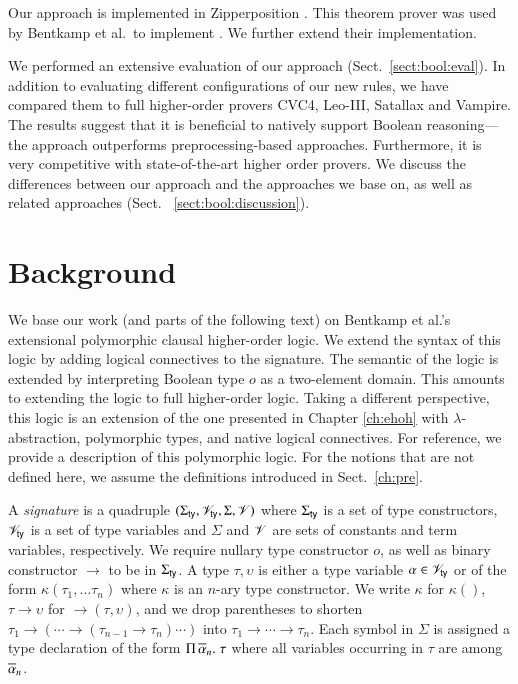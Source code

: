 Our approach is implemented in Zipperposition
\cite{sc-15-simon-phd,sc-supind-17}. This theorem prover was used by Bentkamp et al.\
to implement \lsup{}. We further extend
their implementation.

We performed an extensive evaluation of our approach (Sect.~\ref{sect:bool:eval}).
In addition to evaluating different configurations of our new rules, we have
compared them to full higher-order provers CVC4, Leo-III,  Satallax and Vampire.
The results suggest that it is beneficial to natively support Boolean reasoning---the approach outperforms preprocessing-based approaches. Furthermore, it is
very competitive with state-of-the-art higher order provers. We discuss the differences between our approach and the
approaches we base on, as well as related approaches (Sect.~
\ref{sect:bool:discussion}).


\section{Background} 
\label{sect:bool:background}

We base our work (and parts of the following text) on Bentkamp et al.'s
\cite{bbtvw-21-sup-lam} extensional polymorphic clausal higher-order logic. We
extend the syntax of this logic by adding logical connectives to the signature.
The semantic of the logic is extended by interpreting Boolean type $o$ as a
two-element domain. This amounts to extending the logic to full higher-order
logic. Taking a different perspective, this logic is an extension of the one
presented in Chapter \ref{ch:ehoh} with $\lambda$-abstraction, polymorphic
types, and native logical connectives. For reference, we provide a
description of this polymorphic logic. For the notions that are not defined here,
we assume the definitions introduced in Sect.~\ref{ch:pre}.

A {\em signature} is a quadruple $(\Sigma_\mathsf{ty}, \mathscr{V}_\mathsf{ty}, \Sigma, \mathscr{V})$ where $\Sigma_\mathsf{ty}$ is a
set of type constructors, $\mathscr{V}_\mathsf{ty}$ is a set of type variables and $\Sigma$ and
$\mathscr{V}$ are sets of constants and term variables, respectively. We require nullary
type constructor $o$, as well as binary constructor $\rightarrow$
to be in $\Sigma_\mathsf{ty}$. A type $\tau, \upsilon$ is either a type variable $\alpha \in
\mathscr{V}_\mathsf{ty}$ or of the form $\kappa(\tau_1, \ldots \tau_n)$ where $\kappa$ is an
$n$-ary type constructor. We write $\kappa$ for $\kappa()$, $\tau \rightarrow
\upsilon$ for $\rightarrow(\tau, \upsilon)$, and we drop parentheses to shorten 
$\tau_1 \rightarrow (\cdots \rightarrow (\tau_{n-1} \rightarrow \tau_n) \cdots)$ into $\tau_1 \rightarrow \cdots \rightarrow
\tau_n$. Each symbol in $\Sigma$ is
assigned a type declaration of the form $\Pi\,\overline{\alpha}_{n}.\; \tau$ where all variables
occurring in $\tau$ are among $\overline{\alpha}_{n}$.

